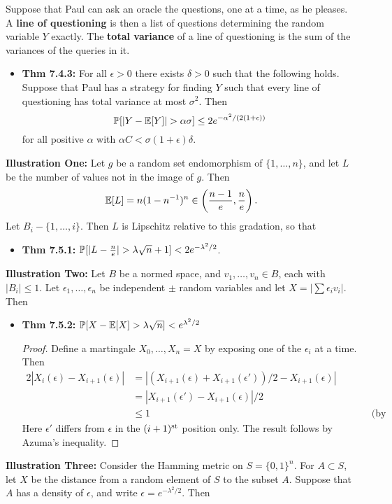 \documentclass[11pt]{article}
\newenvironment{INT}[1][]{\begin{itemize}\small\item\textbf{#1}}{\end{itemize}}
\begin{document}
\begin{chapter7}
\begin{itemise}
\INDENT  Suppose that Paul can ask an oracle the questions, one at a time, as he pleases. A \textbf{line of questioning} is then a list of questions determining the random variable $Y$ exactly. The \textbf{total variance} of a line of questioning is the sum of the variances of the queries in it.
\begin{INT}[Thm 7.4.3:]
For all $\epsilon>0$ there exists $\delta>0$ such that the following holds. Suppose that Paul has a strategy for finding $Y$ such that every line of questioning has total variance at most $\sigma^2$. Then
\[\Prob[|Y-\Exp[Y]|>\alpha\sigma]\leq2e^{-\alpha^2/(2(1+\epsilon))}\]
for all positive $\alpha$ with $\alpha C<\sigma(1+\epsilon)\delta$.
\end{INT}
\item \textbf{Illustration One:} Let $g$ be a random set endomorphism of $\{1,\ldots,n\}$, and let $L$ be the number of values not in the image of $g$. Then
\[\operatorname{\mathbb{E}}[L]=n(1-n^{-1})^n\in\left(\frac{n-1}{e},\frac{n}{e}\right).\]
Let $B_i-\{1,\ldots,i\}$. Then $L$ is Lipschitz relative to this gradation, so that
\begin{INT}[Thm 7.5.1:]
$\Prob[|L-\frac{n}{e}|>\lambda\sqrt n+1]<2e^{-\lambda^2/2}$.
\end{INT}
\item \textbf{Illustration Two:} Let $B$ be a normed space, and $v_1,\ldots,v_n\in B$, each with $|B_i|\leq1$. Let $\epsilon_1,\ldots,\epsilon_n$ be independent $\pm$ random variables and let $X=|\sum\epsilon_iv_i|$. Then
\begin{INT}[Thm 7.5.2:]
$\operatorname{\mathbb{P}}[X-\operatorname{\mathbb{E}}[X]>\lambda\sqrt n]<e^{\lambda^2/2}$
\begin{proof}
Define a martingale $X_0,\ldots,X_n=X$ by exposing one of the $\epsilon_i$ at a time. Then
\begin{alignat*}{2}
|X_i(\epsilon)-X_{i+1}(\epsilon)|&=\left|(X_{i+1}(\epsilon)+X_{i+1}(\epsilon'))/2-X_{i+1}(\epsilon)\right|%
\\&=\left|X_{i+1}(\epsilon')-X_{i+1}(\epsilon)\right|/2%
\\&\leq1&\qquad&\text{(by theorem 7.4.1)}
\end{alignat*}
Here $\epsilon'$ differs from $\epsilon$ in the $(i+1)^\textup{st}$ position only. The result follows by Azuma's inequality.
\end{proof}
\end{INT}
\item \textbf{Illustration Three:} Consider the Hamming metric on $S=\{0,1\}^n$. For $A\subset S$, let $X$ be the distance from a random element of $S$ to the subset $A$. Suppose that $A$ has a density of $\epsilon$, and write $\epsilon=e^{-\lambda^2/2}$. Then

\end{itemise}
\end{chapter7}
\end{document}
